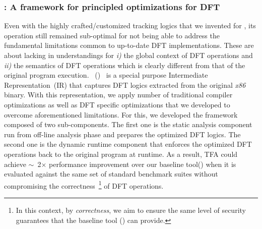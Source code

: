 \documentclass[letterpaper, 10pt]{article}
\begin{document}
\begin{small}
\subsubsection*{\TFA: A framework for principled optimizations for DFT}

Even with the highly crafted/customized tracking logics that we invented for
\libdft, its operation still remained sub-optimal for not being able to address
the fundamental limitations common to up-to-date DFT implementations. 
%
These are about lacking in understandings for {\it i)} the global context of
DFT operations and {\it ii)} the semantics of DFT operations which is clearly
different from that of the original program execution.
%
\TFAFull~(\TFA)~\cite{tfa:2012ndss} is a special purpose Intermediate
Representation~(IR) that captures DFT logics extracted from the original {\it
x86} binary. With this representation, we apply number of traditional compiler
optimizations as well as DFT specific optimizations that we developed to
overcome aforementioned limitations.
%
For this, we developed the framework composed of two sub-components. The first
one is the static analysis component run from off-line analysis phase and
prepares the optimized DFT logics. The second one is the dynamic runtime
component that enforces the optimized DFT operations back to the original
program at runtime.
%
%
As a result, TFA could achieve \(\sim\)~2\(\times\) performance improvement
over  our baseline tool(\libdft) when it is evaluated against the same set of
standard benchmark suites without compromising the correctness~\footnote{In
        this context, by {\it correctness}, we aim to ensure the same level of
security guarantees that the baseline tool (\libdft) can provide.} of DFT
operations.


\end{small}
\end{document}
